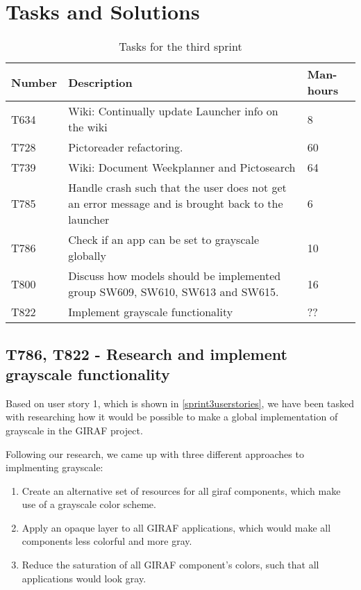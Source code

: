 \section{Tasks and Solutions}
\begin{table}[H]
\begin{centering}
\begin{tabular}{|l|p{9cm}|l|}
\hline
Number 	& Description & Man-hours \\ \hline
T634   	& Wiki: Continually update Launcher info on the wiki & 8\\\hline
T728  	& Pictoreader refactoring. & 60 \\ \hline
T739	& Wiki: Document Weekplanner and Pictosearch & 64\\ \hline
T785	& Handle crash such that the user does not get an error message and is
		  brought back to the launcher & 6\\ \hline
T786 	& Check if an app can be set to grayscale globally & 10\\ \hline
T800 	& Discuss how models should be implemented group SW609, SW610, SW613 and
		  SW615. & 16\\ \hline
T822 	& Implement grayscale functionality & ??\\ \hline
\end{tabular}
\caption{Tasks for the third sprint}
\label{Tasks3}
\end{centering}
\end{table}

\subsection{T786, T822 - Research and implement grayscale functionality}
Based on user story 1, which is shown in \autoref{sprint3userstories}, we have
been tasked with researching how it would be possible to make a global implementation of
grayscale in the GIRAF project.\nl

Following our research, we came up with three different approaches to
implmenting grayscale:

\begin{enumerate}
  \item Create an alternative set of resources for all giraf components, which
  make use of a grayscale color scheme.
  \item Apply an opaque layer to all GIRAF applications, which would make all
  components less colorful and more gray.
  \item Reduce the saturation of all GIRAF component's colors, such that all
  applications would look gray.
\end{enumerate}

